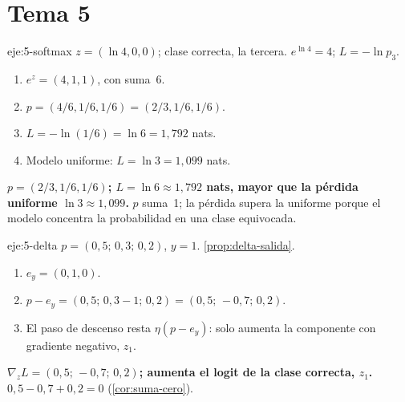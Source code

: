\section{Tema 5}

\begin{solucion}{eje:5-softmax}
\datos $z=(\ln 4,0,0)$; clase correcta, la tercera.
\planteamiento $e^{\ln 4}=4$; $L=-\ln p_3$.
\pasos
\begin{enumerate}[label=\arabic*.]
  \item $e^{z}=(4,1,1)$, con suma~6.
  \item $p=(4/6,1/6,1/6)=(2/3,1/6,1/6)$.
  \item $L=-\ln(1/6)=\ln 6=1{,}792$ nats.
  \item Modelo uniforme: $L=\ln 3=1{,}099$ nats.
\end{enumerate}
\resultado \textbf{$p=(2/3,1/6,1/6)$; $L=\ln 6\approx 1{,}792$ nats, mayor que la pérdida uniforme $\ln 3\approx 1{,}099$.}
\comprobacion $p$ suma~1; la pérdida supera la uniforme porque el modelo concentra la probabilidad en una clase equivocada.
\end{solucion}

\begin{solucion}{eje:5-delta}
\datos $p=(0{,}5;\,0{,}3;\,0{,}2)$, $y=1$.
\planteamiento \cref{prop:delta-salida}.
\pasos
\begin{enumerate}[label=\arabic*.]
  \item $e_y=(0,1,0)$.
  \item $p-e_y=(0{,}5;\,0{,}3-1;\,0{,}2)=(0{,}5;\,-0{,}7;\,0{,}2)$.
  \item El paso de descenso resta $\eta(p-e_y)$: solo aumenta la componente con gradiente negativo, $z_1$.
\end{enumerate}
\resultado \textbf{$\nabla_{\!z}L=(0{,}5;\,-0{,}7;\,0{,}2)$; aumenta el logit de la clase correcta, $z_1$.}
\comprobacion $0{,}5-0{,}7+0{,}2=0$ (\cref{cor:suma-cero}).
\end{solucion}

